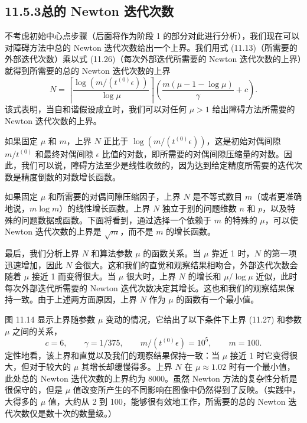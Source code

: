 \documentclass[UTF8,12pt,a4paper,fontset=fandol]{ctexart}
\begin{document}
\subsection*{11.5.3\quad 总的 Newton 迭代次数}

不考虑初始中心点步骤（后面将作为阶段 1 的部分对此进行分析），我们现在可以对障碍方法中总的 Newton 迭代次数给出一个上界。我们用式 (11.13)（所需要的外部迭代次数）乘以式 (11.26)（每次外部迭代所需要的 Newton 迭代次数的上界）就得到所需要的总的 Newton 迭代次数的上界
\begin{equation}
N=\left\lceil\frac{\log(m/(t^{(0)}\epsilon))}{\log\mu}\right\rceil
\left(\frac{m(\mu-1-\log\mu)}{\gamma}+c\right).
\tag{11.27}
\end{equation}
该式表明，当自和谐假设成立时，我们可以对任何 $\mu>1$ 给出障碍方法所需要的 Newton 迭代次数的上界。

如果固定 $\mu$ 和 $m$，上界 $N$ 正比于 $\log(m/(t^{(0)}\epsilon))$，这是初始对偶间隙 $m/t^{(0)}$ 和最终对偶间隙 $\epsilon$ 比值的对数，即所需要的对偶间隙压缩量的对数。因此，我们可以说，障碍方法至少是线性收敛的，因为达到给定精度所需要的迭代次数是精度倒数的对数增长函数。

如果固定 $\mu$ 和所需要的对偶间隙压缩因子，上界 $N$ 是不等式数目 $m$（或者更准确地说，$m\log m$）的线性增长函数。上界 $N$ 独立于别的问题维数 $n$ 和 $p$，以及特殊的问题数据或函数。下面将看到，通过选择一个依赖于 $m$ 的特殊的 $\mu$，可以使 Newton 迭代次数的上界是 $\sqrt{m}$，而不是 $m$ 的增长函数。

最后，我们分析上界 $N$ 和算法参数 $\mu$ 的函数关系。当 $\mu$ 靠近 1 时，$N$ 的第一项迅速增加，因此 $N$ 会很大。这和我们的直觉和观察结果相吻合，外部迭代次数会随着 $\mu$ 接近 1 而变得很大。当 $\mu$ 很大时，上界 $N$ 的增长和 $\mu/\log\mu$ 近似，此时每次外部迭代所需要的 Newton 迭代次数决定其增长。这也和我们的观察结果保持一致。由于上述两方面原因，上界 $N$ 作为 $\mu$ 的函数有一个最小值。

图 11.14 显示上界随参数 $\mu$ 变动的情况，它给出了以下条件下上界 (11.27) 和参数 $\mu$ 之间的关系，
\[
c=6,\qquad \gamma=1/375,\qquad m/(t^{(0)}\epsilon)=10^5,\qquad m=100.
\]
定性地看，该上界和直觉以及我们的观察结果保持一致：当 $\mu$ 接近 1 时它变得很大，但对于较大的 $\mu$ 其增长却缓慢得多。上界 $N$ 在 $\mu\approx 1.02$ 时有一个最小值，此处总的 Newton 迭代次数的上界约为 8000。虽然 Newton 方法的复杂性分析是很保守的，但是 $\mu$ 值改变所产生的不同影响在图像中仍然得到了反映。（实践中，大得多的 $\mu$ 值，大约从 2 到 100，能够很有效地工作，所需要的总的 Newton 迭代次数仅是数十次的数量级。）
\end{document}

